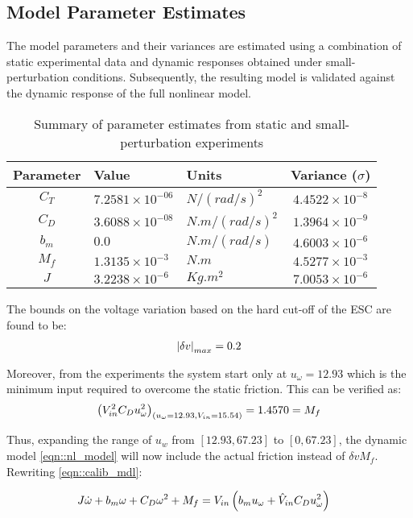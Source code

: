 \subsection{Model Parameter Estimates}
The model parameters and their variances are estimated using a combination of static experimental data and dynamic responses obtained under small-perturbation conditions. Subsequently, the resulting model is validated against the dynamic response of the full nonlinear model.
\begin{table}[h]
    \centering
    \begin{tabular}{c l l c}
        \hline \hline
        Parameter & Value & Units & Variance ($\sigma$)            \\ \hline \hline
        $C_T$ & $7.2581 \times 10^{-06}$ & $N/(rad/s)^2$   & $4.4522 \times 10^{-8}$ \\
        $C_D$ & $3.6088 \times 10^{-08}$ & $N.m/(rad/s)^2$ & $1.3964 \times 10^{-9}$ \\
        $b_m$ & $0.0$                    & $N.m/(rad/s)$   & $4.6003 \times 10^{-6}$  \\
        $M_f$ & $1.3135 \times 10^{-3}$  & $N.m$           & $4.5277 \times 10^{-3}$ \\
        $J$   & $3.2238 \times 10^{-6}$   & $Kg.m^2$        & $7.0053 \times 10^{-6}$ \\
        \hline \hline
    \end{tabular}
    \caption{Summary of parameter estimates from static and small-perturbation experiments}
    \label{tab::parm_ests}
\end{table}

The bounds on the voltage variation based on the hard cut-off of the ESC
are found to be:
\begin{align}
\left\lvert \delta v \right\rvert_{max} = 0.2
\end{align}

Moreover, from the experiments the system start only at $u_\omega = 12.93$ which
is the minimum input required to overcome the static friction. This can be
verified as:
\begin{align}
     \left( V_{in}^2  C_D u_\omega^2  \right)_{\left( u_\omega = 12.93, V_{in} = 15.54 \right)} = 1.4570 =  M_f
\end{align}

Thus, expanding the range of $u_w$ from $[12.93, 67.23]$ to $[0, 67.23]$, the
dynamic model \ref{eqn::nl_model} will now include the actual friction instead
of $\delta v M_f$. Rewriting \ref{eqn::calib_mdl}:

\begin{align}
    &J \dot \omega + b_m \omega + C_D \omega^2 + M_f = V_{in} \left( b_m u_\omega + \hat V_{in} C_D u_\omega^2 \right)
    \label{eqn::0_mdl}
\end{align}
